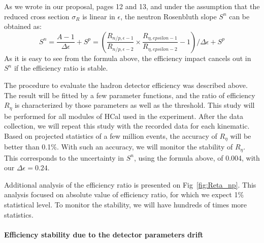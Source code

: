 As we wrote in our proposal, pages 12 and 13, and under the assumption that the reduced cross section $\sigma_R$ is linear in $\epsilon$,
the neutron Rosenbluth slope $S^n$ can be obtained as:
%
\begin{equation}
  S^n = \frac{A-1}{\Delta\epsilon} + S^p = (\frac{R_{n/p, \epsilon-1}}{R_{n/p, \epsilon-2}}\times \frac{R_{\eta, epsilon-1}}{R_{\eta, epsilon-2}}-1)/\Delta\epsilon + S^p
  \label{eq:Sn}
\end{equation}
%
As it is easy to see from the formula above, the efficiency impact cancels out in $S^n$ if the efficiency ratio is stable.

The procedure to evaluate the hadron detector efficiency was described above.
The result will be fitted by a few parameter functions, and the ratio of efficiency $R_{\eta}$ is characterized by those parameters as well as the threshold.
This study will be performed for all modules of HCal used in the experiment.
After the data collection, we will repeat this study with the recorded data for each kinematic.
Based on projected statistics of a few million events, the accuracy of $R_{\eta}$ will be better than 0.1\%.
With such an accuracy, we will monitor the stability of $R_{\eta}$.
This corresponds to the uncertainty in $S^n$, using the formula above, of 0.004, with our $\Delta \epsilon = 0.24$. 

Additional analysis of the efficiency ratio is presented on Fig~\ref{fig:Reta_np}.
This analysis focused on absolute value of efficiency ratio, for which we expect 1\% statistical level.
To monitor the stability, we will have hundreds of times more statistics.
%
%

\paragraph{Efficiency stability due to the detector parameters drift}

